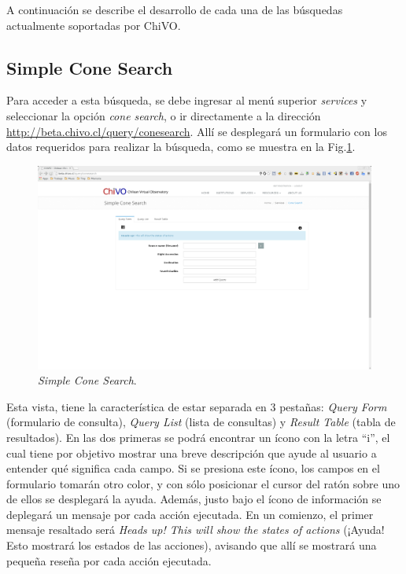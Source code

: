 A continuación se describe el desarrollo de cada una de las búsquedas
actualmente soportadas por ChiVO.


\subsection{Simple Cone Search}

Para acceder a esta búsqueda, se debe ingresar al menú superior
\emph{services} y seleccionar la opción \emph{cone search}, o ir
directamente a la dirección
\url{http://beta.chivo.cl/query/conesearch}. Allí se desplegará un
formulario con los datos requeridos para realizar la búsqueda, como se
muestra en la Fig.\ref{img:scs}.

\begin{figure}[ht!]
    \begin{center}
	\includegraphics[scale=.2]{img/scs}
    \end{center}
    \caption{\emph{Simple Cone Search}.}\label{img:scs}
\end{figure}

Esta vista, tiene la característica de estar separada en 3 pestañas:
\emph{Query Form} (formulario de consulta), \emph{Query List} (lista
de consultas) y \emph{Result Table} (tabla de resultados). En las dos
primeras se podrá encontrar un ícono con la letra ``i'', el cual tiene
por objetivo mostrar una breve descripción que ayude al usuario a
entender qué significa cada campo. Si se presiona este ícono, los
campos en el formulario tomarán otro color, y con sólo posicionar el
cursor del ratón sobre uno de ellos se desplegará la ayuda. Además,
justo bajo el ícono de información se deplegará un mensaje por cada
acción ejecutada. En un comienzo, el primer mensaje resaltado será
\emph{Heads up! This will show the states of actions} (¡Ayuda! Esto
mostrará los estados de las acciones), avisando que allí se mostrará
una pequeña reseña por cada acción ejecutada.

